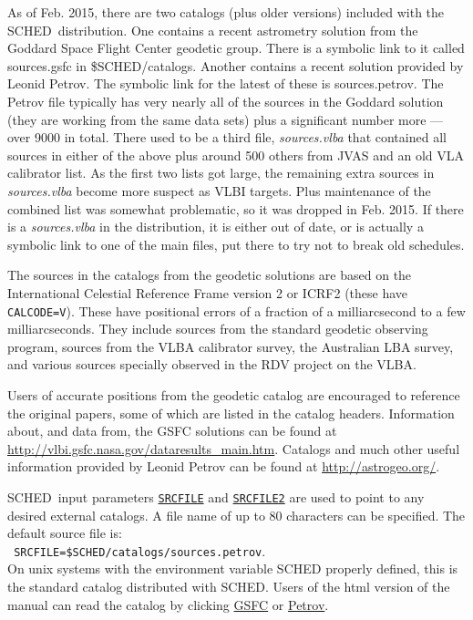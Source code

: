 \documentclass{report}
\newcommand{\sched}{{\sc SCHED}}
\newcommand{\schedb}{{\sc SCHED~}}
\begin{document}
As of Feb. 2015, there are two catalogs (plus older versions) included
with the \schedb distribution.  One contains a recent astrometry
solution from the Goddard Space Flight Center geodetic group.  There
is a symbolic link to it called sources.gsfc in \$SCHED/catalogs.  Another
contains a recent solution provided by Leonid Petrov.  The symbolic
link for the latest of these is sources.petrov.  The Petrov file
typically has very nearly all of the sources in the Goddard solution
(they are working from the same data sets) plus a significant number
more --- over 9000 in total.  There used to be a third file, 
{\sl sources.vlba} that contained all sources in either of the above
plus around 500 others from JVAS and an old VLA calibrator list.  
As the first two lists got large, the remaining extra sources in
{\sl sources.vlba} become more suspect as VLBI targets.  Plus maintenance
of the combined list was somewhat problematic, so it was dropped
in Feb. 2015.  If there is a {\sl sources.vlba} in the distribution, it
is either out of date, or is actually a symbolic link to one of the
main files, put there to try not to break old schedules.

The sources in the catalogs from the geodetic solutions are based on
the International Celestial Reference Frame version 2 or ICRF2 (these
have {\tt CALCODE=V}).  These have positional errors of a fraction of
a milliarcsecond to a few milliarcseconds.  They include sources from
the standard geodetic observing program, sources from the VLBA
calibrator survey, the Australian LBA survey, and various sources
specially observed in the RDV project on the VLBA. 

Users of accurate positions from the geodetic catalog are encouraged
to reference the original papers, some of which are listed in the
catalog headers.  Information about, and data from, the GSFC solutions
can be found at
{\href{http://vlbi.gsfc.nasa.gov/dataresults\_main.htm}{http://vlbi.gsfc.nasa.gov/dataresults\_main.htm}}.
Catalogs and much other useful information provided by Leonid Petrov
can be found at {\href{http://astrogeo.org/}{http://astrogeo.org/}}.

\schedb input parameters 
{\hyperref[MP:SRCFILE]{{\tt SRCFILE}}} and
{\hyperref[MP:SRCFILE2]{{\tt SRCFILE2}}} are used to point to any desired
external catalogs.  A file name of up to 80 characters can be
specified. The default source file is: \\ {\tt
SRCFILE=\$SCHED/catalogs/sources.petrov}.  \\ On unix systems with the
environment variable SCHED properly defined, this is the standard
catalog distributed with \sched.  Users of the html version of the
manual can read the catalog by clicking
{\href{catalogs/sources.gsfc}{GSFC}} or
{\href{catalogs/sources.petrov}{Petrov}}.
\end{document}
